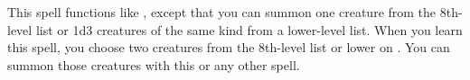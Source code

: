 \begin{spellheader}
\end{spellheader}
\begin{spellcontent}
    \spelleffect This spell functions like , except that you can summon one creature from the 8th-level list or 1d3 creatures of the same kind from a lower-level list. When you learn this spell, you choose two creatures from the 8th-level list or lower on . You can summon those creatures with this or any other  spell.
    \spelldur{\durshort \dismissable}
\end{spellcontent}
\begin{spellfooter}

\end{spellfooter}

